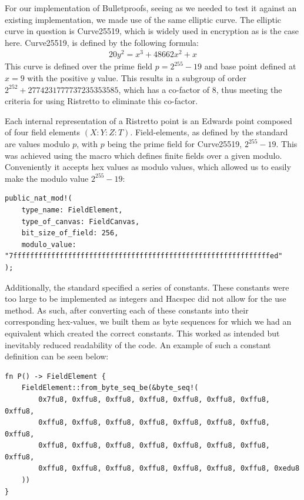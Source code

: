 \documentclass{article}
\newcommand*\ttvar[1]{\texttt{\expandafter\dottvar\detokenize{#1}\relax}}
\newcommand*\dottvar[1]{\ifx\relax#1\else
  \expandafter\ifx\string_#1\string_\allowbreak\else#1\fi
  \expandafter\dottvar\fi}
\newcommand{\eq}[1]{\begin{alignat*}{20}#1\end{alignat*}}
\begin{document}
For our implementation of Bulletproofs, seeing as we needed to test it
against an existing implementation, we made use of the same elliptic
curve. The elliptic curve in question is Curve25519, which is widely
used in encryption as is the case here. Curve25519, is defined by the
following formula:
\eq{
	y^2 = x^3 + 48662x^2 + x
}
This curve is defined over the prime field $p = 2^{255} - 19$ and base
point defined at $x = 9$ with the positive $y$ value. This results
in a subgroup of order $2^{252} + 2774231777737235353585$, which has
a co-factor of $8$, thus meeting the criteria for using Ristretto to
eliminate this co-factor.

Each internal representation of a Ristretto point is an Edwards point
composed of four field elements $(X : Y : Z : T)$. Field-elements,
as defined by the standard are values modulo $p$, with $p$ being the
prime field for Curve25519, $2^{255} - 19$. This was achieved using
the \ttvar{public_nat_mod!()} macro which defines finite fields over
a given modulo. Conveniently it accepts hex values as modulo values,
which allowed us to easily make the modulo value $2^{255} - 19$:

\begin{lstlisting}
public_nat_mod!(
	type_name: FieldElement,
	type_of_canvas: FieldCanvas,
	bit_size_of_field: 256,
	modulo_value: "7fffffffffffffffffffffffffffffffffffffffffffffffffffffffffffffed"
);
\end{lstlisting}

Additionally, the standard specified a series of constants. These
constants were too large to be implemented as integers and Hacspec
did not allow for the use \ttvar{from_hex()} method. As such, after
converting each of these constants into their corresponding hex-values,
we built them as byte sequences for which we had an equivalent
\ttvar{from_byte_seq_be()} which created the correct constants. This
worked as intended but inevitably reduced readability of the code. An
example of such a constant definition can be seen below:

\begin{lstlisting}
fn P() -> FieldElement {
	FieldElement::from_byte_seq_be(&byte_seq!(
		0x7fu8, 0xffu8, 0xffu8, 0xffu8, 0xffu8, 0xffu8, 0xffu8, 0xffu8,
		0xffu8, 0xffu8, 0xffu8, 0xffu8, 0xffu8, 0xffu8, 0xffu8, 0xffu8,
		0xffu8, 0xffu8, 0xffu8, 0xffu8, 0xffu8, 0xffu8, 0xffu8, 0xffu8,
		0xffu8, 0xffu8, 0xffu8, 0xffu8, 0xffu8, 0xffu8, 0xffu8, 0xedu8
	))
}
\end{lstlisting}
\end{document}
